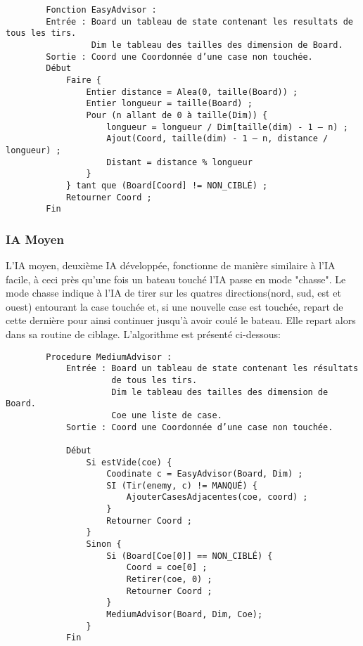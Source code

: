     \begin{verbatim}
        Fonction EasyAdvisor :
        Entrée : Board un tableau de state contenant les resultats de tous les tirs.
                 Dim le tableau des tailles des dimension de Board.
        Sortie : Coord une Coordonnée d’une case non touchée.
        Début
            Faire {
                Entier distance = Alea(0, taille(Board)) ;
                Entier longueur = taille(Board) ;
                Pour (n allant de 0 à taille(Dim)) {
                    longueur = longueur / Dim[taille(dim) - 1 – n) ;
                    Ajout(Coord, taille(dim) - 1 – n, distance / longueur) ;
                    Distant = distance % longueur
                }
            } tant que (Board[Coord] != NON_CIBLÉ) ;
            Retourner Coord ;
        Fin
    \end{verbatim}
        
\subsubsection{IA Moyen}
	L'IA moyen, deuxième IA développée, fonctionne de manière similaire à l'IA facile, à ceci près qu'une fois un bateau touché l'IA passe en mode "chasse".\newline
	Le mode chasse indique à l'IA de tirer sur les quatres directions(nord, sud, est et ouest) entourant la case touchée et, si une nouvelle case est touchée, repart de cette dernière pour ainsi continuer jusqu'à avoir coulé le bateau.\newline
	Elle repart alors dans sa routine de ciblage.\newline
	L'algorithme est présenté ci-dessous:
    
    \begin{verbatim}
        Procedure MediumAdvisor :
            Entrée : Board un tableau de state contenant les résultats
            		 de tous les tirs.
                     Dim le tableau des tailles des dimension de Board.
                     Coe une liste de case.
            Sortie : Coord une Coordonnée d’une case non touchée.
            
            Début
                Si estVide(coe) {
                    Coodinate c = EasyAdvisor(Board, Dim) ;
                    SI (Tir(enemy, c) != MANQUÉ) {
                        AjouterCasesAdjacentes(coe, coord) ;
                    }
                    Retourner Coord ;
                }
                Sinon {
                    Si (Board[Coe[0]] == NON_CIBLÉ) {
                        Coord = coe[0] ;
                        Retirer(coe, 0) ;
                        Retourner Coord ;
                    }
                    MediumAdvisor(Board, Dim, Coe);
                }
            Fin
    \end{verbatim}

